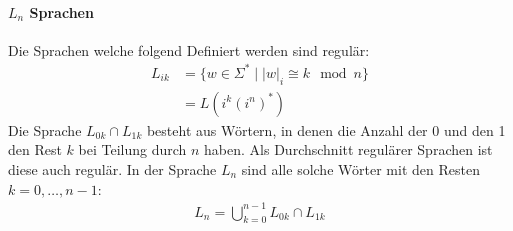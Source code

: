 \paragraph{$L_n$ Sprachen} Die Sprachen welche folgend Definiert werden sind regulär:
\begin{align*}
    L_{ik} &= \{ w \in \Sigma^* \mid |w|_i \cong k \mod n \} \\
           &= L(i^k(i^n)^*)
\end{align*}
Die Sprache \(L_{0k} \cap L_{1k} \) besteht aus Wörtern, in denen die Anzahl der 0 und den 1 den Rest \(k\) bei Teilung durch \(n\) haben. Als Durchschnitt regulärer Sprachen ist diese auch regulär. In der Sprache \(L_n\) sind alle solche Wörter mit den Resten \(k=0, \dots , n-1\):
\begin{align*}
    L_n = \bigcup_{k=0}^{n-1} L_{0k} \cap L_{1k}
\end{align*}